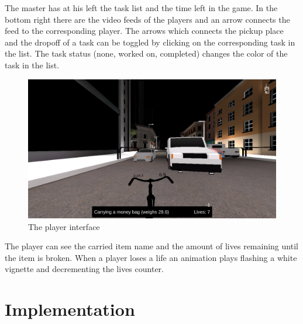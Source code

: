 \documentclass[12pt]{article}
\begin{document}
The master has at his left the task list and the time left in the game. In the bottom right there are the video feeds of the players and an arrow connects the feed to the corresponding player. The arrows which connects the pickup place and the dropoff of a task can be toggled by clicking on the corresponding task in the list. The task status (none, worked on, completed) changes the color of the task in the list.
\begin{figure}[H]
\includegraphics[width=\textwidth]{gameplay}
\caption{The player interface}
\end{figure}
The player can see the carried item name and the amount of lives remaining until the item is broken. When a player loses a life an animation plays flashing a white vignette and decrementing the lives counter.

\clearpage

\section{Implementation}
\end{document}
